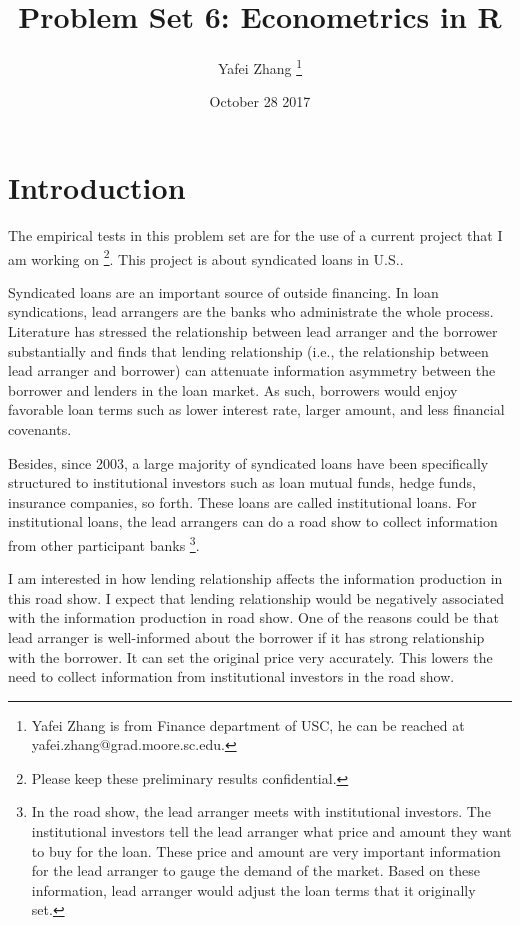 \documentclass[letterpaper,12pt]{article}
\title{Problem Set 6: Econometrics in R}
\author{Yafei Zhang \thanks{Yafei Zhang is from Finance department of USC, he can be reached at yafei.zhang@grad.moore.sc.edu.}}
\date{October 28 2017}
\theoremstyle{definition}
\begin{document}
	
	\maketitle
	
	\vspace{5mm}

\section{Introduction}

The empirical tests in this problem set are for the use of a current project that I am working on \footnote{Please keep these preliminary results confidential.}. This project is about syndicated loans in U.S.. 

Syndicated loans are an important source of outside financing. In loan syndications, lead arrangers are the banks who administrate the whole process. Literature has stressed the relationship between lead arranger and the borrower substantially and finds that lending relationship (i.e., the relationship between lead arranger and borrower) can attenuate information asymmetry between the borrower and lenders in the loan market. As such, borrowers would enjoy favorable loan terms such as lower interest rate, larger amount, and less financial covenants.

Besides, since 2003, a large majority of syndicated loans have been specifically structured to institutional investors such as loan mutual funds, hedge funds, insurance companies, so forth. These loans are called institutional loans. For institutional loans, the lead arrangers can do a road show to collect information from other participant banks \footnote{In the road show, the lead arranger meets with institutional investors. The institutional investors tell the lead arranger what price and amount they want to buy for the loan. These price and amount are very important information for the lead arranger to gauge the demand of the market. Based on these information, lead arranger would adjust the loan terms that it originally set.}.

I am interested in how lending relationship affects the information production in this road show. I expect that lending relationship would be negatively associated with the information production in road show. One of the reasons could be that lead arranger is well-informed about the borrower if it has strong relationship with the borrower. It can set the original price very accurately. This lowers the need to collect information from institutional investors in the road show.
\end{document}

